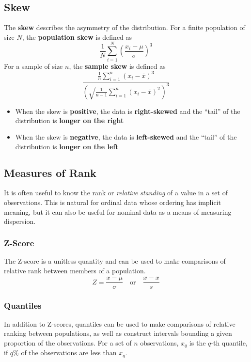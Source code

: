 \documentclass{article}
\begin{document}
\subsection{Skew}
The \textbf{skew} describes the asymmetry of the distribution.
For a finite population of size \(N\), the \textbf{population skew} is defined as
\begin{equation*}
    \frac{1}{N} \sum_{i = 1}^N \left( \frac{x_i - \mu}{\sigma} \right)^3
\end{equation*}
For a sample of size \(n\), the \textbf{sample skew} is defined as
\begin{equation*}
    \frac{\frac{1}{n} \sum_{i = 1}^n \left( x_i - \overline{x} \right)^3}{\left( \sqrt{\frac{1}{n - 1} \sum_{i = 1}^n \left( x_i - \overline{x} \right)^2} \right)^3}
\end{equation*}
\begin{itemize}
    \item When the skew is \textbf{positive}, the data is \textbf{right-skewed} and the ``tail'' of the distribution is \textbf{longer on the right}
    \item When the skew is \textbf{negative}, the data is \textbf{left-skewed} and the ``tail'' of the distribution is \textbf{longer on the left}
\end{itemize}
\subsection{Measures of Rank}
It is often useful to know the rank or \textit{relative standing} of a value in a set of observations.
This is natural for ordinal data whose ordering has implicit meaning, but it can
also be useful for nominal data as a means of measuring dispersion.
\subsubsection{Z-Score}
The Z-score is a unitless quantity and can be used to make comparisons of relative rank between members of a population.
\begin{equation*}
    Z = \frac{x  - \mu}{\sigma} \quad \text{or} \quad \frac{x - \overline{x}}{s}
\end{equation*}
\subsubsection{Quantiles}
In addition to Z-scores, quantiles can be used to make comparisons of relative ranking between populations,
as well as construct intervals bounding a given proportion of the observations.
For a set of \(n\) observations, \(x_q\) is the \(q\)-th quantile, if \(q\)\% of the observations are less than \(x_q\).
\end{document}
